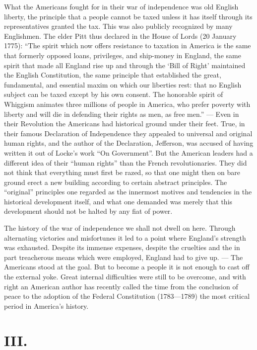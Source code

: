 \documentclass[12pt,a4paper,openany]{book}
\newcommand{\opage}[1]{\marginnote{\footnotesize\textit{[#1]}}}
\begin{document}
What the Americans fought for in their war of independence
was old English liberty, the principle that a people cannot
be taxed unless it has itself through its representatives
granted the tax. This was also publicly recognized by
many Englishmen. The elder Pitt thus declared in
the House of Lords (20 January 1775): ``The spirit which now offers resistance to
taxation in America is the same that formerly
opposed loans, privileges, and ship-money in England,
the same spirit that made all England rise up and
through the `Bill of Right' maintained the English Constitution, the
same principle that established the great, fundamental, and
essential maxim on which our liberties rest: that no
English subject can be taxed except by his own consent.
The honorable spirit of Whiggism animates three millions
of people in America, who prefer poverty with liberty and
will die in defending their rights as men,
as free men.'' --- Even in their Revolution the
Americans had historical ground under their feet. True, in their famous
Declaration of Independence they appealed to universal
and original human rights, and the author of the Declaration, Jefferson, was accused of having written it out
\opage{120}of Locke's work ``On Government''. But the American
leaders had a different idea of their
``human rights'' than the French revolutionaries. They did not think that
everything must first be razed, so that one might then on bare ground
erect a new building according to certain abstract principles.
The ``original'' principles one regarded as the innermost
motives and tendencies in the historical development itself, and
what one demanded was merely that this development should not
be halted by any fiat of power.

The history of the war of independence we shall not dwell on here.
Through alternating victories and misfortunes it led to a point where
England's strength was exhausted. Despite its immense expenses,
despite the cruelties and the in part treacherous means which
were employed, England had to give up. --- The Americans stood
at the goal. But to become a people it is not enough to
cast off the external yoke. Great internal difficulties were still
to be overcome, and with right an American author
has recently called the time from the conclusion of peace to the adoption of the Federal Constitution
(1783---1789) the most critical period in America's
history.

\section*{III.}
\end{document}
